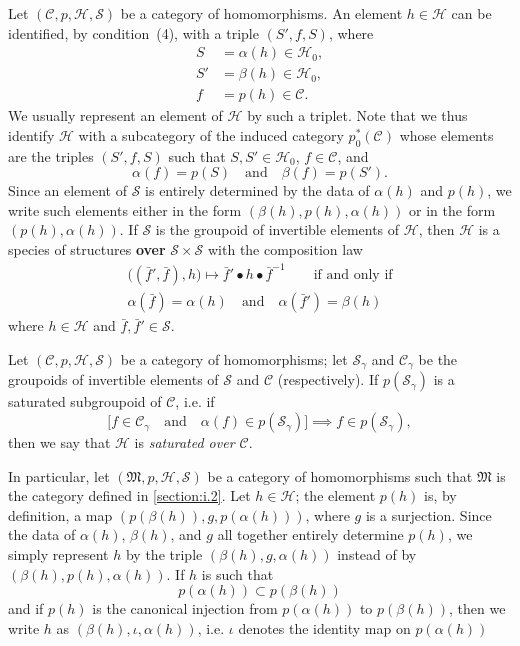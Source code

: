 \documentclass[fleqn]{article}
\newcommand{\unsure}[1]{{\color{purple}\textbf{#1}}}
\newcommand{\CC}{\mathcal{C}}
\newcommand{\HH}{\mathcal{H}}
\renewcommand{\SS}{\mathcal{S}}
\newcommand{\MM}{\mathfrak{M}}
\begin{document}
Let $(\CC,p,\HH,\SS)$ be a category of homomorphisms.
An element $h\in\HH$ can be identified, by condition~(4), with a triple $(S',f,S)$, where
\[
  \begin{aligned}
    S
    &= \alpha(h) \in\HH_0,
  \\S'
    &= \beta(h) \in\HH_0,
  \\f
    &= p(h)\in\CC.
  \end{aligned}
\]
We usually represent an element of $\HH$ by such a triplet.
Note that we thus identify $\HH$ with a subcategory of the induced category $p_0^*(\CC)$ whose elements are the triples $(S',f,S)$ such that $S,S'\in\HH_0$, $f\in\CC$, and
\[
  \alpha(f)=p(S)
  \quad\text{and}\quad
  \beta(f)=p(S').
\]
Since an element of $\SS$ is entirely determined by the data of $\alpha(h)$ and $p(h)$, we write such elements either in the form $(\beta(h),p(h),\alpha(h))$ or in the form $(p(h),\alpha(h))$.
If $\SS$ is the groupoid of invertible elements of $\HH$, then $\HH$ is a species of structures \unsure{over} $\SS\times\SS$ with the composition law
\[
  \begin{gathered}
    \big((\bar{f}',\bar{f}),h\big)
    \longmapsto\bar{f}'\bullet h\bullet\bar{f}^{-1}
    \qquad\text{if and only if}
  \\\alpha(\bar{f})=\alpha(h)
    \quad\text{and}\quad
    \alpha(\bar{f}')=\beta(h)
  \end{gathered}
\]
where $h\in\HH$ and $\bar{f},\bar{f}'\in\SS$.

Let $(\CC,p,\HH,\SS)$ be a category of homomorphisms;
let $\SS_\gamma$ and $\CC_\gamma$ be the groupoids of invertible elements of $\SS$ and $\CC$ (respectively).
If $p(\SS_\gamma)$ is a saturated \cite{3a} subgroupoid of $\CC$, i.e. if
\[
  \big[f\in\CC_\gamma
  \quad\text{and}\quad
  \alpha(f)\in p(\SS_\gamma)\big]
  \implies
  f\in p(\SS_\gamma),
\]
then we say that $\HH$ is \emph{saturated over $\CC$}.

In particular, let $(\MM,p,\HH,\SS)$ be a category of homomorphisms such that $\MM$ is the category defined in \cref{section:i.2}.
Let $h\in\HH$;
the element $p(h)$ is, by definition, a map $(p(\beta(h)),g,p(\alpha(h)))$, where $g$ is a surjection.
Since the data of $\alpha(h)$, $\beta(h)$, and $g$ all together entirely determine $p(h)$, we simply represent $h$ by the triple $(\beta(h),g,\alpha(h))$ instead of by $(\beta(h),p(h),\alpha(h))$.
If $h$ is such that
\[
  p(\alpha(h))
  \subset p(\beta(h))
\]
and if $p(h)$ is the canonical injection from $p(\alpha(h))$ to $p(\beta(h))$, then we write $h$ as $(\beta(h),\iota,\alpha(h))$, i.e. $\iota$ denotes the identity map on $p(\alpha(h))$
\end{document}
